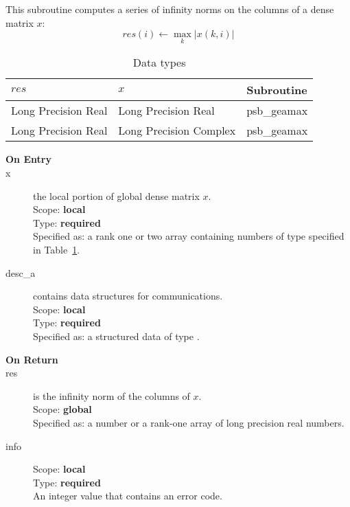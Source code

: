 
This subroutine computes a series of  infinity norms on the columns of
a  dense matrix  $x$: 
\[ res(i) \leftarrow \max_k |x(k,i)| \]

\begin{table}[h]
\begin{center}
\begin{tabular}{lll}
\hline
$res$&  $x$& {\bf Subroutine}\\
\hline
Long Precision Real    &Long Precision Real    & psb\_geamax\\
Long Precision Real &Long Precision Complex & psb\_geamax\\	
\hline
\end{tabular}
\end{center}
\caption{Data types\label{tab:f90mamax}}
\end{table}

\begin{description}
\item[\bf On Entry]
\item[x] the local portion of global dense matrix
$x$. \\
Scope: {\bf local} \\
Type: {\bf required} \\
Specified as: a rank one or two array 
containing numbers of type specified in
Table~\ref{tab:f90mamax}. 
\item[desc\_a] contains data structures for communications.\\
Scope: {\bf local} \\
Type: {\bf required}\\
Specified as: a structured data of type \descdata.
\item[\bf On Return] 
\item[res] is the infinity norm of the columns of $x$.\\
Scope: {\bf global} \\
Specified as: a number or a rank-one array  of long precision real numbers. 
\item[info] 
Scope: {\bf local} \\
Type: {\bf required} \\
An integer value that contains an error code. 
\end{description}

%
%


